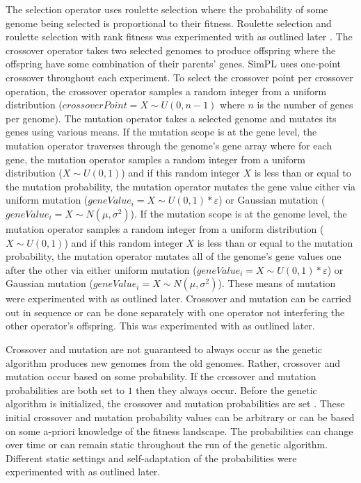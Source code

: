 \renewcommand{\baselinestretch}{1.9}

\vspace{3mm}

The selection operator uses roulette selection where the probability of some genome being selected is proportional to their fitness. Roulette selection and roulette selection with rank fitness was experimented with as outlined later \cite{geneticalgorithm}. The crossover operator takes two selected genomes to produce offspring where the offspring have some combination of their parents' genes. SimPL uses one-point crossover throughout each experiment. To select the crossover point per crossover operation, the crossover operator samples a random integer from a uniform distribution ($crossoverPoint = X\!\sim\!U(0,n-1)$ where $n$ is the number of genes per genome). The mutation operator takes a selected genome and mutates its genes using various means. If the mutation scope is at the gene level, the mutation operator traverses through the genome's gene array where for each gene, the mutation operator samples a random integer from a uniform distribution ($X\!\sim\!U(0,1)$) and if this random integer $X$ is less than or equal to the mutation probability, the mutation operator mutates the gene value either via uniform mutation ($geneValue_i = X\!\sim\!U(0,1) * \varepsilon$) or Gaussian mutation ($geneValue_i = X\!\sim\!N(\mu,\sigma^2)$). If the mutation scope is at the genome level, the mutation operator samples a random integer from a uniform distribution ($X\sim U(0,1)$) and if this random integer $X$ is less than or equal to the mutation probability, the mutation operator mutates all of the genome's gene values one after the other via either uniform mutation ($geneValue_i = X\!\sim\!U(0,1) * \varepsilon$) or Gaussian mutation ($geneValue_i = X\!\sim\!N(\mu,\sigma^2)$). These means of mutation were experimented with as outlined later. Crossover and mutation can be carried out in sequence or can be done separately with one operator not interfering the other operator's offspring. This was experimented with as outlined later.

Crossover and mutation are not guaranteed to always occur as the genetic algorithm produces new genomes from the old genomes. Rather, crossover and mutation occur based on some probability. If the crossover and mutation probabilities are both set to $1$ then they always occur. Before the genetic algorithm is initialized, the crossover and mutation probabilities are set \cite{self_adapt}. These initial crossover and mutation probability values can be arbitrary or can be based on some a-priori knowledge of the fitness landscape. The probabilities can change over time or can remain static throughout the run of the genetic algorithm. Different static settings and self-adaptation of the probabilities were experimented with as outlined later. 

